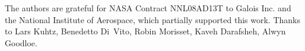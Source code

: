 \documentclass[12pt]{article}
\theoremstyle{example}
\begin{document}
The authors are grateful for NASA Contract NNL08AD13T to Galois Inc. and the
National Institute of Aerospace, which partially supported this work.
Thanks to Lars Kuhtz, Benedetto Di~Vito,  Robin Morisset, Kaveh
Darafsheh, Alwyn Goodloe.  

{






 



}

\begin{appendices}



\end{appendices}
\end{document}
